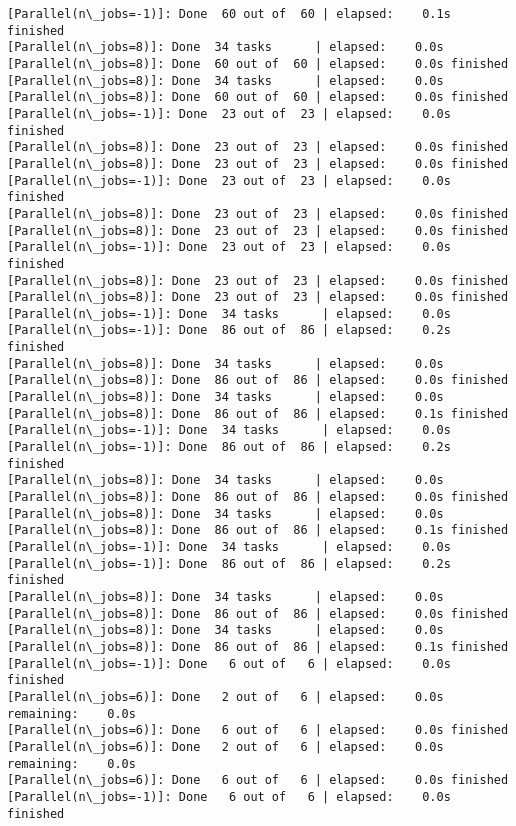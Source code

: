 \documentclass[11pt]{article}
\begin{document}
\begin{Verbatim}[commandchars=\\\{\}]
[Parallel(n\_jobs=-1)]: Done  60 out of  60 | elapsed:    0.1s finished
[Parallel(n\_jobs=8)]: Done  34 tasks      | elapsed:    0.0s
[Parallel(n\_jobs=8)]: Done  60 out of  60 | elapsed:    0.0s finished
[Parallel(n\_jobs=8)]: Done  34 tasks      | elapsed:    0.0s
[Parallel(n\_jobs=8)]: Done  60 out of  60 | elapsed:    0.0s finished
[Parallel(n\_jobs=-1)]: Done  23 out of  23 | elapsed:    0.0s finished
[Parallel(n\_jobs=8)]: Done  23 out of  23 | elapsed:    0.0s finished
[Parallel(n\_jobs=8)]: Done  23 out of  23 | elapsed:    0.0s finished
[Parallel(n\_jobs=-1)]: Done  23 out of  23 | elapsed:    0.0s finished
[Parallel(n\_jobs=8)]: Done  23 out of  23 | elapsed:    0.0s finished
[Parallel(n\_jobs=8)]: Done  23 out of  23 | elapsed:    0.0s finished
[Parallel(n\_jobs=-1)]: Done  23 out of  23 | elapsed:    0.0s finished
[Parallel(n\_jobs=8)]: Done  23 out of  23 | elapsed:    0.0s finished
[Parallel(n\_jobs=8)]: Done  23 out of  23 | elapsed:    0.0s finished
[Parallel(n\_jobs=-1)]: Done  34 tasks      | elapsed:    0.0s
[Parallel(n\_jobs=-1)]: Done  86 out of  86 | elapsed:    0.2s finished
[Parallel(n\_jobs=8)]: Done  34 tasks      | elapsed:    0.0s
[Parallel(n\_jobs=8)]: Done  86 out of  86 | elapsed:    0.0s finished
[Parallel(n\_jobs=8)]: Done  34 tasks      | elapsed:    0.0s
[Parallel(n\_jobs=8)]: Done  86 out of  86 | elapsed:    0.1s finished
[Parallel(n\_jobs=-1)]: Done  34 tasks      | elapsed:    0.0s
[Parallel(n\_jobs=-1)]: Done  86 out of  86 | elapsed:    0.2s finished
[Parallel(n\_jobs=8)]: Done  34 tasks      | elapsed:    0.0s
[Parallel(n\_jobs=8)]: Done  86 out of  86 | elapsed:    0.0s finished
[Parallel(n\_jobs=8)]: Done  34 tasks      | elapsed:    0.0s
[Parallel(n\_jobs=8)]: Done  86 out of  86 | elapsed:    0.1s finished
[Parallel(n\_jobs=-1)]: Done  34 tasks      | elapsed:    0.0s
[Parallel(n\_jobs=-1)]: Done  86 out of  86 | elapsed:    0.2s finished
[Parallel(n\_jobs=8)]: Done  34 tasks      | elapsed:    0.0s
[Parallel(n\_jobs=8)]: Done  86 out of  86 | elapsed:    0.0s finished
[Parallel(n\_jobs=8)]: Done  34 tasks      | elapsed:    0.0s
[Parallel(n\_jobs=8)]: Done  86 out of  86 | elapsed:    0.1s finished
[Parallel(n\_jobs=-1)]: Done   6 out of   6 | elapsed:    0.0s finished
[Parallel(n\_jobs=6)]: Done   2 out of   6 | elapsed:    0.0s remaining:    0.0s
[Parallel(n\_jobs=6)]: Done   6 out of   6 | elapsed:    0.0s finished
[Parallel(n\_jobs=6)]: Done   2 out of   6 | elapsed:    0.0s remaining:    0.0s
[Parallel(n\_jobs=6)]: Done   6 out of   6 | elapsed:    0.0s finished
[Parallel(n\_jobs=-1)]: Done   6 out of   6 | elapsed:    0.0s finished

\end{Verbatim}
\end{document}
